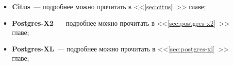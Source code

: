 \begin{itemize}
  \item \textbf{Citus}~--- подробнее можно прочитать в <<\ref{sec:citus}~>> главе;
  \item \textbf{Postgres-X2}~--- подробнее можно прочитать в <<\ref{sec:postgres-x2}~>> главе;
  \item \textbf{Postgres-XL}~--- подробнее можно прочитать в <<\ref{sec:postgres-xl}~>> главе;
\end{itemize}
